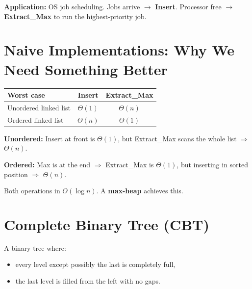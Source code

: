 \documentclass[11pt]{article}
\begin{document}
\textbf{Application:} OS job scheduling. Jobs arrive $\to$ \textbf{Insert}. Processor free $\to$ \textbf{Extract\_Max} to run the highest-priority job.

\section{Naive Implementations: Why We Need Something Better}

\begin{center}
\renewcommand{\arraystretch}{1.5}
\begin{tabular}{l c c}
\hline
\textbf{\textcolor{heapblue}{Worst case}} & \textbf{Insert} & \textbf{Extract\_Max}\\
\hline
Unordered linked list & \textcolor{greenO}{$\Theta(1)$} & \textcolor{rustW}{$\Theta(n)$}\\
Ordered linked list   & \textcolor{rustW}{$\Theta(n)$} & \textcolor{greenO}{$\Theta(1)$}\\
\hline
\end{tabular}
\end{center}

\textbf{Unordered:} Insert at front is $\Theta(1)$, but Extract\_Max scans the whole list $\Rightarrow$ $\Theta(n)$.

\textbf{Ordered:} Max is at the end $\Rightarrow$ Extract\_Max is $\Theta(1)$, but inserting in sorted position $\Rightarrow$ $\Theta(n)$.

\begin{keybox}[Goal]
Both operations in \textcolor{rustW}{$O(\log n)$}. A \textbf{max-heap} achieves this.
\end{keybox}

\section{Complete Binary Tree (CBT)}

\begin{defbox}
A binary tree where:
\begin{itemize}[leftmargin=1.4em,itemsep=1pt]
  \item every level except possibly the last is completely full,
  \item the last level is filled \textcolor{rustW}{from the left} with no gaps.
\end{itemize}
\end{defbox}
\end{document}
